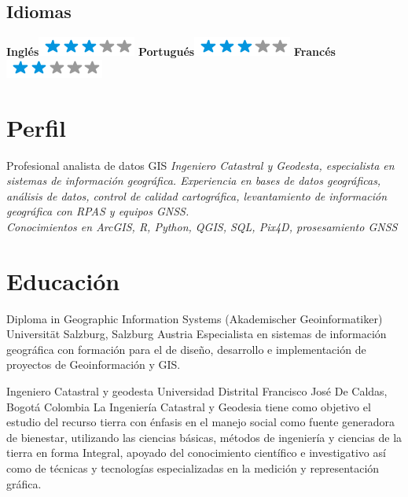 \documentclass[]{friggeri-cv}
\begin{document}
\begin{aside}
  \section{Idiomas}
    \textbf{Inglés}\includegraphics[scale=0.40]{img/3stars.png}
    \textbf{Portugués}\includegraphics[scale=0.40]{img/3stars.png}
    \textbf{Francés}\includegraphics[scale=0.40]{img/2stars.png}
    ~
\end{aside}

\section{Perfil}
\begin{entrylist}

  \entry
    {  }
    {Profesional analista de datos GIS\vspace{\baselineskip}}
    { }
    {\emph{Ingeniero Catastral y Geodesta, especialista en sistemas de información geográfica. Experiencia en bases de datos geográficas, análisis de datos, control de calidad cartográfica, levantamiento de información geográfica con RPAS y equipos GNSS.
    \\Conocimientos en ArcGIS, R, Python, QGIS, SQL, Pix4D, prosesamiento GNSS
}}
  
\end{entrylist}
\section{Educación}
\begin{entrylist}
  \entry
    
    {Diploma in Geographic Information Systems (Akademischer Geoinformatiker)}
    {Universität Salzburg, Salzburg Austria}
    {Especialista en sistemas de información geográfica con formación para el de diseño, desarrollo e implementación de proyectos de Geoinformación y GIS.\\}
\end{entrylist}

\begin{entrylist}
  \entry
    
    {Ingeniero Catastral y geodesta}
    {Universidad Distrital Francisco José De Caldas, Bogotá Colombia}
    {La Ingeniería Catastral y Geodesia tiene como objetivo el estudio del recurso tierra con énfasis en el manejo social como fuente generadora de bienestar, utilizando las ciencias básicas, métodos de ingeniería y ciencias de la tierra en forma Integral, apoyado del conocimiento científico e investigativo así como de técnicas y tecnologías especializadas en la medición y representación gráfica.\\}
\end{entrylist}
\end{document}
